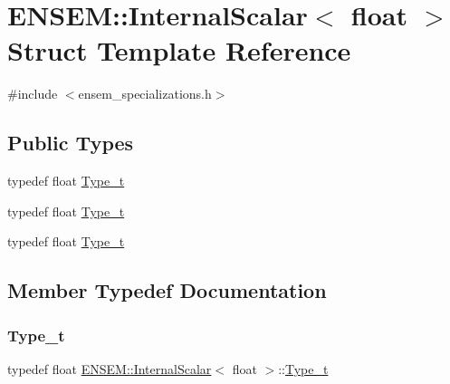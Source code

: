 \hypertarget{structENSEM_1_1InternalScalar_3_01float_01_4}{}\section{E\+N\+S\+EM\+:\+:Internal\+Scalar$<$ float $>$ Struct Template Reference}
\label{structENSEM_1_1InternalScalar_3_01float_01_4}


{\ttfamily \#include $<$ensem\+\_\+specializations.\+h$>$}

\subsection*{Public Types}
\begin{DoxyCompactItemize}
\item 
typedef float \mbox{\hyperlink{structENSEM_1_1InternalScalar_3_01float_01_4_a0302b6aa9102572c13ac0b2874a380f0}{Type\+\_\+t}}
\item 
typedef float \mbox{\hyperlink{structENSEM_1_1InternalScalar_3_01float_01_4_a0302b6aa9102572c13ac0b2874a380f0}{Type\+\_\+t}}
\item 
typedef float \mbox{\hyperlink{structENSEM_1_1InternalScalar_3_01float_01_4_a0302b6aa9102572c13ac0b2874a380f0}{Type\+\_\+t}}
\end{DoxyCompactItemize}


\subsection{Member Typedef Documentation}
\mbox{\label{structENSEM_1_1InternalScalar_3_01float_01_4_a0302b6aa9102572c13ac0b2874a380f0}} 
\subsubsection{\texorpdfstring{Type\_t}{Type\_t}\hspace{0.1cm}{\footnotesize\ttfamily [1/3]}}
{\footnotesize\ttfamily typedef float \mbox{\hyperlink{structENSEM_1_1InternalScalar}{E\+N\+S\+E\+M\+::\+Internal\+Scalar}}$<$ float $>$\+::\mbox{\hyperlink{structENSEM_1_1InternalScalar_3_01float_01_4_a0302b6aa9102572c13ac0b2874a380f0}{Type\+\_\+t}}}


